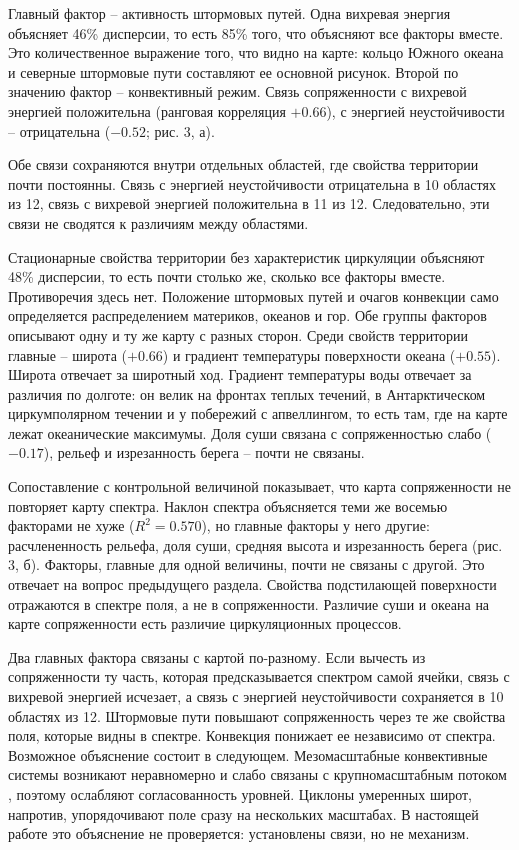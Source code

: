 \documentclass[12pt,a4paper]{article}
\begin{document}
Главный фактор -- активность штормовых путей. Одна вихревая энергия объясняет 46\% дисперсии, то есть 85\% того, что объясняют все факторы вместе. Это количественное выражение того, что видно на карте: кольцо Южного океана и северные штормовые пути составляют ее основной рисунок. Второй по значению фактор -- конвективный режим. Связь сопряженности с вихревой энергией положительна (ранговая корреляция $+0.66$), с энергией неустойчивости -- отрицательна ($-0.52$; рис. 3, а).

Обе связи сохраняются внутри отдельных областей, где свойства территории почти постоянны. Связь с энергией неустойчивости отрицательна в 10 областях из 12, связь с вихревой энергией положительна в 11 из 12. Следовательно, эти связи не сводятся к различиям между областями.

Стационарные свойства территории без характеристик циркуляции объясняют 48\% дисперсии, то есть почти столько же, сколько все факторы вместе. Противоречия здесь нет. Положение штормовых путей и очагов конвекции само определяется распределением материков, океанов и гор. Обе группы факторов описывают одну и ту же карту с разных сторон. Среди свойств территории главные -- широта ($+0.66$) и градиент температуры поверхности океана ($+0.55$). Широта отвечает за широтный ход. Градиент температуры воды отвечает за различия по долготе: он велик на фронтах теплых течений, в Антарктическом циркумполярном течении и у побережий с апвеллингом, то есть там, где на карте лежат океанические максимумы. Доля суши связана с сопряженностью слабо ($-0.17$), рельеф и изрезанность берега -- почти не связаны.

Сопоставление с контрольной величиной показывает, что карта сопряженности не повторяет карту спектра. Наклон спектра объясняется теми же восемью факторами не хуже ($R^2 = 0.570$), но главные факторы у него другие: расчлененность рельефа, доля суши, средняя высота и изрезанность берега (рис. 3, б). Факторы, главные для одной величины, почти не связаны с другой. Это отвечает на вопрос предыдущего раздела. Свойства подстилающей поверхности отражаются в спектре поля, а не в сопряженности. Различие суши и океана на карте сопряженности есть различие циркуляционных процессов.

Два главных фактора связаны с картой по-разному. Если вычесть из сопряженности ту часть, которая предсказывается спектром самой ячейки, связь с вихревой энергией исчезает, а связь с энергией неустойчивости сохраняется в 10 областях из 12. Штормовые пути повышают сопряженность через те же свойства поля, которые видны в спектре. Конвекция понижает ее независимо от спектра. Возможное объяснение состоит в следующем. Мезомасштабные конвективные системы возникают неравномерно и слабо связаны с крупномасштабным потоком \cite{Houze2004,Zhang2007,Judt2020}, поэтому ослабляют согласованность уровней. Циклоны умеренных широт, напротив, упорядочивают поле сразу на нескольких масштабах. В настоящей работе это объяснение не проверяется: установлены связи, но не механизм.
\end{document}
